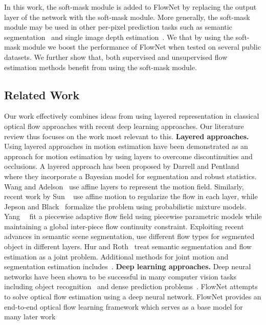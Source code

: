 \documentclass[10pt,twocolumn,letterpaper]{article}
\begin{document}
In this work, the soft-mask module is added to FlowNet by replacing the output layer of the network with the soft-mask module. More generally, the soft-mask module may be used in other per-pixel prediction tasks such as semantic segmentation~\cite{long2015fully} and single image depth estimation~\cite{eigen2014depth}. We that by using the soft-mask module we boost the performance of FlowNet when tested on several public datasets.  We further show that, both supervised and unsupervised flow estimation methods benefit from using the soft-mask module.

\subsection{Related Work}
Our work effectively combines ideas from using layered representation in classical optical flow approaches with recent deep learning approaches. Our literature review thus focuses on the work most relevant to this.
\newline
\newline
\noindent \textbf{Layered approaches.}
Using layered approaches in motion estimation have been demonstrated as an approach for motion estimation by using layers to overcome discontinuities and occlusions. A layered approach has been proposed by Darrell and Pentland~\cite{darrell1991robust}\cite{darrell1995cooperative} where they incorporate a Bayesian model for segmentation and robust statistics. Wang and Adelson~\cite{wang1993layered}\cite{wang1994representing} use affine layers to represent the motion field. Similarly, recent work by Sun \etal~\cite{sun2010layered}\cite{sun2012layered} use affine motion to regularize the flow in each layer, while Jepson and Black~\cite{341161} formalize the problem using probabilistic mixture models. Yang~\etal~\cite{yang2015dense} fit a piecewise adaptive flow field using piecewise parametric models while maintaining a global inter-piece flow continuity constraint. Exploiting recent advances in semantic scene segmentation, \cite{Sevilla-Lara_2016_CVPR} use different flow types for segmented object in different layers. Hur and Roth~\cite{Hur2016} treat semantic segmentation and flow estimation as a joint problem. Additional methods for joint motion and segmentation estimation includes~\cite{birchfield1999multiway}\cite{cremers2005motion}\cite{memin2002hierarchical}\cite{roussos2012dense}\cite{unger2012joint}\cite{yamaguchi2013robust}\cite{zitnick2005consistent}.
\newline
\newline
\noindent \textbf{Deep learning approaches.}
Deep neural networks have been shown to be successful in many computer vision tasks including object recognition~\cite{he2016deep} and dense prediction problems~\cite{zheng2015conditional}\cite{long2015fully}. FlowNet attempts to solve optical flow estimation using a deep neural network. FlowNet provides an end-to-end optical flow learning framework which serves as a base model for many later work~\cite{Ilg_2017_CVPR}\cite{ahmadi2016unsupervised}\cite{ren2017unsupervised}\cite{DBLP:journals/corr/YuHD16}
\end{document}
